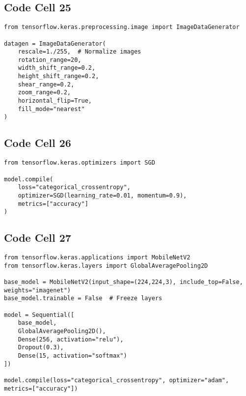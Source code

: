 \documentclass{article}
\begin{document}
\subsection*{Code Cell 25}
\begin{lstlisting}
from tensorflow.keras.preprocessing.image import ImageDataGenerator

datagen = ImageDataGenerator(
    rescale=1./255,  # Normalize images
    rotation_range=20,
    width_shift_range=0.2,
    height_shift_range=0.2,
    shear_range=0.2,
    zoom_range=0.2,
    horizontal_flip=True,
    fill_mode="nearest"
)

\end{lstlisting}

\subsection*{Code Cell 26}
\begin{lstlisting}
from tensorflow.keras.optimizers import SGD

model.compile(
    loss="categorical_crossentropy",
    optimizer=SGD(learning_rate=0.01, momentum=0.9),
    metrics=["accuracy"]
)

\end{lstlisting}

\subsection*{Code Cell 27}
\begin{lstlisting}
from tensorflow.keras.applications import MobileNetV2
from tensorflow.keras.layers import GlobalAveragePooling2D

base_model = MobileNetV2(input_shape=(224,224,3), include_top=False, weights="imagenet")
base_model.trainable = False  # Freeze layers

model = Sequential([
    base_model,
    GlobalAveragePooling2D(),
    Dense(256, activation="relu"),
    Dropout(0.3),
    Dense(15, activation="softmax")
])

model.compile(loss="categorical_crossentropy", optimizer="adam", metrics=["accuracy"])

\end{lstlisting}
\end{document}
